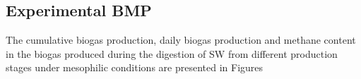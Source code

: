 \subsection{Experimental BMP}
The cumulative biogas production, daily biogas production and methane content in the biogas produced during the digestion of SW from different production stages under mesophilic conditions are presented in Figures